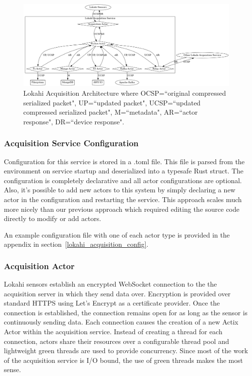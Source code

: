 \begin{figure}
	\centering
	\includegraphics[width=\linewidth]{figures/lokahi_acquisition.png}
	\caption{Lokahi Acquisition Architecture where OCSP=``original compressed serialized packet", UP=``updated packet", UCSP=``updated compressed serialized packet", M=``metadata", AR=``actor response", DR=``device response".}
	\label{fig:LokahiAcquisition}
\end{figure}

\subsubsection{Acquisition Service Configuration}

Configuration for this service is stored in a .toml file. This file is parsed from the environment on service startup and deserialized into a typesafe Rust struct. The configuration is completely declarative and all actor configurations are optional. Also, it's possible to add new actors to this system by simply declaring a new actor in the configuration and restarting the service. This approach scales much more nicely than our previous approach which required editing the source code directly to modify or add actors.

An example configuration file with one of each actor type is provided in the appendix in section~\ref{lokahi_acquisition_config}.

\subsubsection{Acquisition Actor}
Lokahi sensors establish an encrypted WebSocket connection to the the acquisition server in which they send data over. Encryption is provided over standard HTTPS using Let's Encrypt as a certificate provider. Once the connection is established, the connection remains open for as long as the sensor is continuously sending data. Each connection causes the creation of a new Actix Actor within the acquisition service. Instead of creating a thread for each connection, actors share their resources over a configurable thread pool and lightweight green threads are used to provide concurrency. Since most of the work of the acquisition service is I/O bound, the use of green threads makes the most sense.


